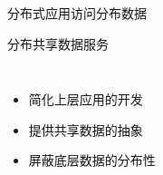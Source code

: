 % 
\begin{frame}{分布式应用访问分布数据}
  
\end{frame}
\begin{frame}{分布共享数据服务}
  \begin{columns}
	  \begin{itemize}[<+->]
		\item 简化上层应用的开发
		\item 提供共享数据的抽象
		\item 屏蔽底层数据的分布性
	  \end{itemize}
  \end{columns}
\end{frame}
